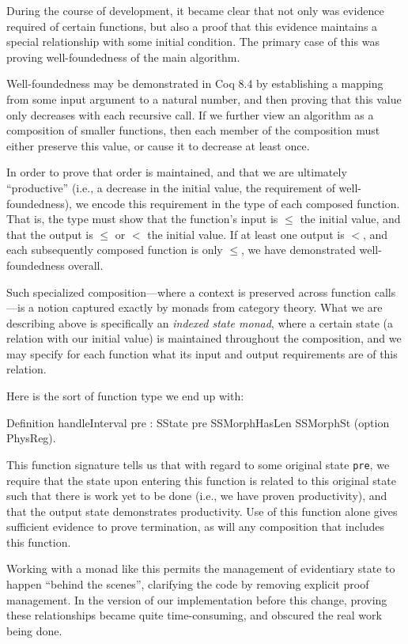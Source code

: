 \documentclass{llncs}
\begin{document}
During the course of development, it became clear that not only was evidence
required of certain functions, but also a proof that this evidence maintains a
special relationship with some initial condition.  The primary case of this
was proving well-foundedness of the main algorithm.

Well-foundedness may be demonstrated in Coq 8.4 by establishing a mapping from
some input argument to a natural number, and then proving that this value only
decreases with each recursive call.  If we further view an algorithm as a
composition of smaller functions, then each member of the composition must
either preserve this value, or cause it to decrease at least once.

In order to prove that order is maintained, and that we are ultimately
``productive'' (i.e., a decrease in the initial value, the requirement of
well-foundedness), we encode this requirement in the type of each composed
function.  That is, the type must show that the function's input is $\le$ the
initial value, and that the output is $\le$ or $<$ the initial value.  If at
least one output is $<$, and each subsequently composed function is only
$\le$, we have demonstrated well-foundedness overall.

Such specialized composition---where a context is preserved across function
calls---is a notion captured exactly by monads from category theory.  What we
are describing above is specifically an \emph{indexed state monad}, where a
certain state (a relation with our initial value) is maintained throughout the
composition, and we may specify for each function what its input and output
requirements are of this relation.

Here is the sort of function type we end up with:

\begin{coq_example*}
Definition handleInterval {pre}
  : SState pre SSMorphHasLen SSMorphSt (option PhysReg).
\end{coq_example*}

This function signature tells us that with regard to some original state
\texttt{pre}, we require that the state upon entering this function is related
to this original state such that there is work yet to be done (i.e., we have
proven productivity), and that the output state demonstrates productivity.
Use of this function alone gives sufficient evidence to prove termination, as
will any composition that includes this function.

Working with a monad like this permits the management of evidentiary state to
happen ``behind the scenes'', clarifying the code by removing explicit proof
management.  In the version of our implementation before this change, proving
these relationships became quite time-consuming, and obscured the real work
being done.
\end{document}
